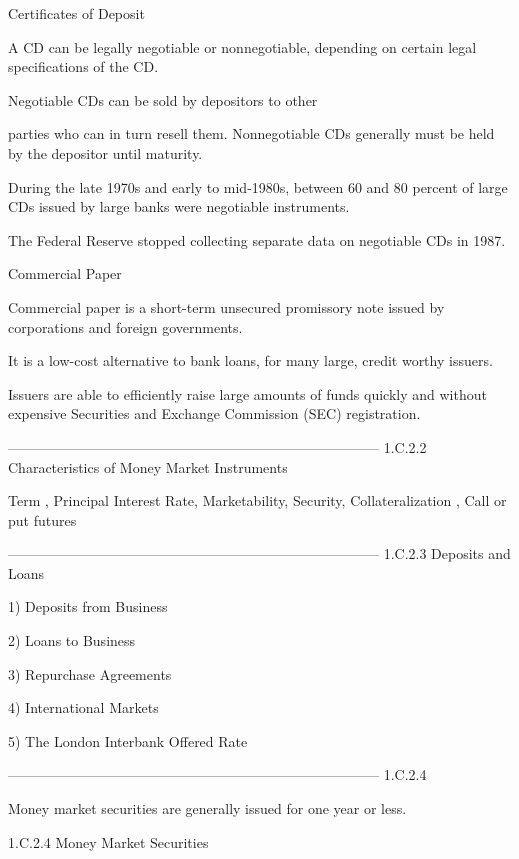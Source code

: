 Certificates of Deposit

A CD can be legally negotiable or nonnegotiable, depending on certain legal specifications of the CD. 

Negotiable CDs can be sold by depositors to other 

parties who can in turn resell them. Nonnegotiable CDs generally must be held by the depositor until maturity. 

During the late 1970s and early to mid-1980s, between 60 and 80 percent of large CDs issued by large banks were negotiable instruments. 

The Federal Reserve stopped collecting separate data on negotiable CDs in 1987.


Commercial Paper

Commercial paper is a short-term unsecured promissory note issued by corporations and foreign governments.  

It is a low-cost alternative to bank loans, for many large, credit worthy issuers.   

Issuers are able to efficiently raise large amounts of funds quickly and without expensive Securities and Exchange Commission (SEC) registration.




--------------------------------------------------------------------------------
1.C.2.2 Characteristics of Money Market Instruments

Term , Principal Interest Rate, Marketability, Security, Collateralization , Call or put futures

 


--------------------------------------------------------------------------------
1.C.2.3 Deposits and Loans


1) Deposits from Business

2) Loans to Business

3) Repurchase Agreements

4) International Markets

5) The London Interbank Offered Rate





--------------------------------------------------------------------------------
1.C.2.4

Money market securities are generally issued for one year or less.

 

1.C.2.4 Money Market Securities


